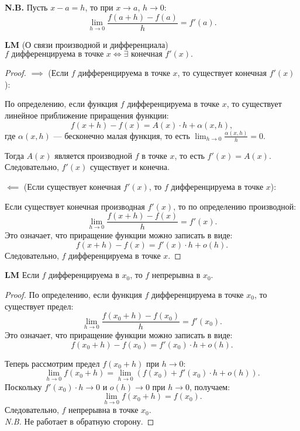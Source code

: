 \textbf{N.B.} Пусть \( x-a = h \), то при \( x \to a \), \( h \to 0 \):
\[
\lim_{h \to 0} \frac{f(a+h) - f(a)}{h} = f'(a).
\]

\textbf{LM} (О связи производной и дифференциала)\\
\( f \text{ дифференцируема в точке } x \iff \exists \text{ конечная } f'(x). \)

\begin{proof}
    \(\implies\) (Если \( f \) дифференцируема в точке \( x \), то существует конечная \( f'(x) \)):

    По определению, если функция \( f \) дифференцируема в точке \( x \), то существует линейное приближение приращения функции:
    \[
    f(x+h) - f(x) = A(x) \cdot h + \alpha(x, h),
    \]
    где \( \alpha(x, h) \) — бесконечно малая функция, то есть \( \lim_{h \to 0} \frac{\alpha(x, h)}{h} = 0 \).

    Тогда \( A(x) \) является производной \( f \) в точке \( x \), то есть \( f'(x) = A(x) \). Следовательно, \( f'(x) \) существует и конечна.

    \(\impliedby\) (Если существует конечная \( f'(x) \), то \( f \) дифференцируема в точке \( x \)):

    Если существует конечная производная \( f'(x) \), то по определению производной:
    \[
    \lim_{h \to 0} \frac{f(x+h) - f(x)}{h} = f'(x).
    \]
    Это означает, что приращение функции можно записать в виде:
    \[
    f(x+h) - f(x) = f'(x) \cdot h + o(h).
    \]
    Следовательно, \( f \) дифференцируема в точке \( x \).
\end{proof}

\textbf{LM} Если \( f \) дифференцируема в \( x_0 \), то \( f \) непрерывна в \( x_0 \).

\begin{proof}
    По определению, если функция \( f \) дифференцируема в точке \( x_0 \), то существует предел:
    \[
    \lim_{h \to 0} \frac{f(x_0 + h) - f(x_0)}{h} = f'(x_0).
    \]
    Это означает, что приращение функции можно записать в виде:
    \[
    f(x_0 + h) - f(x_0) = f'(x_0) \cdot h + o(h).
    \]

    Теперь рассмотрим предел \( f(x_0 + h) \) при \( h \to 0 \):
    \[
    \lim_{h \to 0} f(x_0 + h) = \lim_{h \to 0} \left( f(x_0) + f'(x_0) \cdot h + o(h) \right).
    \]
    Поскольку \( f'(x_0) \cdot h \to 0 \) и \( o(h) \to 0 \) при \( h \to 0 \), получаем:
    \[
    \lim_{h \to 0} f(x_0 + h) = f(x_0).
    \]
    Следовательно, \( f \) непрерывна в точке \( x_0 \).\\
    \textit{N.B.} Не работает в обратную сторону.
\end{proof}


